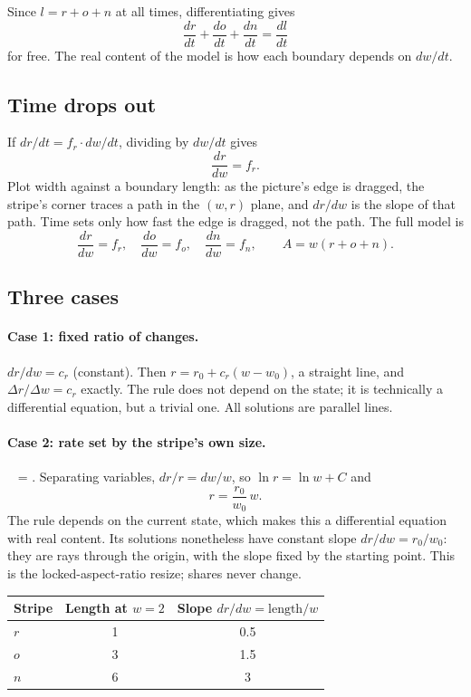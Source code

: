\documentclass[11pt]{article}
\begin{document}
Since $l = r + o + n$ at all times, differentiating gives
\[
  \frac{dr}{dt} + \frac{do}{dt} + \frac{dn}{dt} = \frac{dl}{dt}
\]
for free. The real content of the model is how each boundary depends on $dw/dt$.

\subsection{Time drops out}

If $dr/dt = f_r\cdot dw/dt$, dividing by $dw/dt$ gives
\[
  \frac{dr}{dw} = f_r .
\]
Plot width against a boundary length: as the picture's edge is dragged, the stripe's corner traces a path in the $(w,r)$ plane, and $dr/dw$ is the slope of that path. Time sets only how fast the edge is dragged, not the path. The full model is
\[
  \frac{dr}{dw} = f_r,\quad \frac{do}{dw} = f_o,\quad \frac{dn}{dw} = f_n,\qquad A = w(r+o+n).
\]

\subsection{Three cases}

\paragraph{Case 1: fixed ratio of changes.} $dr/dw = c_r$ (constant). Then $r = r_0 + c_r(w - w_0)$, a straight line, and $\Delta r/\Delta w = c_r$ exactly. The rule does not depend on the state; it is technically a differential equation, but a trivial one. All solutions are parallel lines.

\paragraph{Case 2: rate set by the stripe's own size.}
\
   = .
\]
Separating variables, $dr/r = dw/w$, so $\ln r = \ln w + C$ and
\[
  r = \frac{r_0}{w_0}\,w .
\]
The rule depends on the current state, which makes this a differential equation with real content. Its solutions nonetheless have constant slope $dr/dw = r_0/w_0$: they are rays through the origin, with the slope fixed by the starting point. This is the locked-aspect-ratio resize; shares never change.

\begin{center}
\begin{tabular}{lcc}
\toprule
Stripe & Length at $w=2$ & Slope $dr/dw = \text{length}/w$ \\
\midrule
$r$ & 1 & 0.5 \\
$o$ & 3 & 1.5 \\
$n$ & 6 & 3 \\
\bottomrule
\end{tabular}
\end{center}
\end{document}
